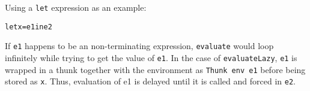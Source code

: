 Using a \texttt{let} expression as an example:
\begin{alltt}
  let x = e1 in e2
\end{alltt}
If \texttt{e1} happens to be an non-terminating expression, \texttt{evaluate}
would loop infinitely while trying to get the value of \texttt{e1}.
In the case of \texttt{evaluateLazy}, \texttt{e1} is wrapped in a thunk
together with the environment as \texttt{Thunk env e1} before being stored
as \texttt{x}. Thus, evaluation of e1 is delayed until it is called and forced
in \texttt{e2}.
